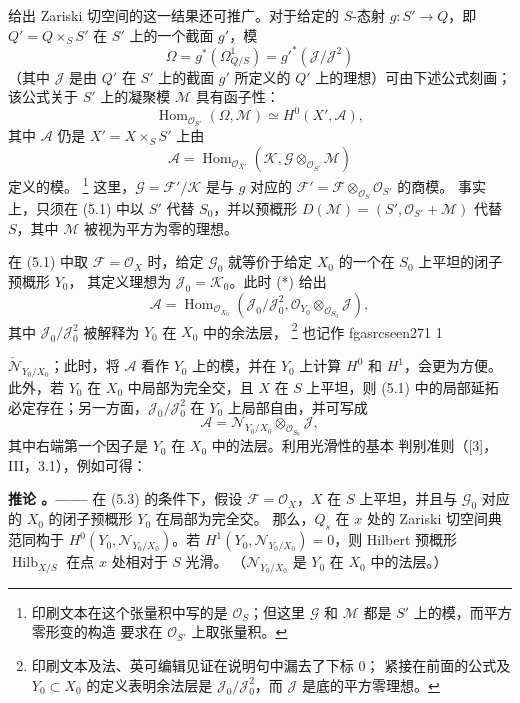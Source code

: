 \documentclass[12pt,twoside,openany]{book}
\numberwithin{equation}{section}
\newcommand{\fgaunitid}{unbound}
\newcommand{\src}[1]{%
  \phantomsection
  \hypertarget{src:\fgaunitid:#1}{}%
  \hypertarget{fga.\fgaunitid.p#1}{}%
  \ifcsname fgasrcseen#1\endcsname\else
    \expandafter\gdef\csname fgasrcseen#1\endcsname{1}%
    \hypertarget{src:#1}{}%
  \fi
  \marginpar{\raggedleft\footnotesize\sffamily #1}%
}
\theoremstyle{plain}
\theoremstyle{definition}
\theoremstyle{remark}
\newcommand{\result}[2]{%
  \par\medskip\noindent\textbf{#1%
  \if\relax\detokenize{#2}\relax\else\space#2\fi。——}\enspace
}
\begin{document}
给出 Zariski 切空间的这一结果还可推广。对于给定的 $S$-态射
$g:S'\longrightarrow Q$，即 $Q'=Q\times_SS'$ 在 $S'$ 上的一个截面
$g'$，模
\[
\Omega=g^*(\Omega^1_{Q/S})=g'^*(\mathcal J/\mathcal J^2)
\]
（其中 $\mathcal J$ 是由 $Q'$ 在 $S'$ 上的截面 $g'$ 所定义的
$Q'$ 上的理想）可由下述公式刻画；该公式关于 $S'$ 上的凝聚模
$\mathcal M$ 具有函子性：
\[
\operatorname{Hom}_{\mathcal O_{S'}}(\Omega,\mathcal M)
\simeq H^0(X',\mathcal A),
\]
其中 $\mathcal A$ 仍是 $X'=X\times_SS'$ 上由
\[
\mathcal A=\operatorname{Hom}_{\mathcal O_{X'}}
(\mathcal K,\mathcal G\otimes_{\mathcal O_{S'}}\mathcal M)
\]
定义的模。
\footnote{印刷文本在这个张量积中写的是 $\mathcal O_S$；但这里
$\mathcal G$ 和 $\mathcal M$ 都是 $S'$ 上的模，而平方零形变的构造
要求在 $\mathcal O_{S'}$ 上取张量积。}
这里，$\mathcal G=\mathcal F'/\mathcal K$ 是与 $g$ 对应的
$\mathcal F'=\mathcal F\otimes_{\mathcal O_S}\mathcal O_{S'}$ 的商模。
事实上，只须在 (5.1) 中以 $S'$ 代替 $S_0$，并以预概形
$D(\mathcal M)=(S',\mathcal O_{S'}+\mathcal M)$ 代替 $S$，其中
$\mathcal M$ 被视为平方为零的理想。

在 (5.1) 中取 $\mathcal F=\mathcal O_X$ 时，给定 $\mathcal G_0$
就等价于给定 $X_0$ 的一个在 $S_0$ 上平坦的闭子预概形 $Y_0$，
其定义理想为 $\mathcal J_0=\mathcal K_0$。此时 (*) 给出
\[
\mathcal A=\operatorname{Hom}_{\mathcal O_{X_0}}
(\mathcal J_0/\mathcal J_0^2,
\mathcal O_{Y_0}\otimes_{\mathcal O_{S_0}}\mathcal J),
\]
其中 $\mathcal J_0/\mathcal J_0^2$ 被解释为 $Y_0$ 在 $X_0$ 中的余法层，
\footnote{印刷文本及法、英可编辑见证在说明句中漏去了下标 $0$；
紧接在前面的公式及 $Y_0\subset X_0$ 的定义表明余法层是
$\mathcal J_0/\mathcal J_0^2$，而 $\mathcal J$ 是底的平方零理想。}
也记作
\src{271}
$\check{\mathcal N}_{Y_0/X_0}$；此时，将 $\mathcal A$ 看作 $Y_0$
上的模，并在 $Y_0$ 上计算 $H^0$ 和 $H^1$，会更为方便。此外，若
$Y_0$ 在 $X_0$ 中局部为完全交，且 $X$ 在 $S$ 上平坦，则 (5.1)
中的局部延拓必定存在；另一方面，$\mathcal J_0/\mathcal J_0^2$ 在
$Y_0$ 上局部自由，并可写成
\[
\mathcal A=\mathcal N_{Y_0/X_0}\otimes_{\mathcal O_{S_0}}\mathcal J,
\]
其中右端第一个因子是 $Y_0$ 在 $X_0$ 中的法层。利用光滑性的基本
判别准则（[3]，III，3.1），例如可得：

\result{推论}{5.4} 在 (5.3) 的条件下，假设
$\mathcal F=\mathcal O_X$，$X$ 在 $S$ 上平坦，并且与
$\mathcal G_0$ 对应的 $X_0$ 的闭子预概形 $Y_0$ 在局部为完全交。
那么，$Q_s$ 在 $x$ 处的 Zariski 切空间典范同构于
$H^0(Y_0,\mathcal N_{Y_0/X_0})$。若
$H^1(Y_0,\mathcal N_{Y_0/X_0})=0$，则 Hilbert 预概形
$\operatorname{Hilb}_{X/S}$ 在点 $x$ 处相对于 $S$ 光滑。
（$\mathcal N_{Y_0/X_0}$ 是 $Y_0$ 在 $X_0$ 中的法层。）
\end{document}
